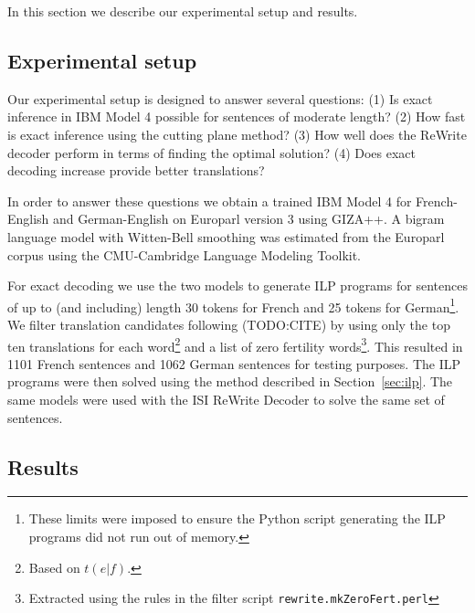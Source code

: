 In this section we describe our experimental setup and results.

\subsection{Experimental setup}
\label{sec:experimental-setup}

Our experimental setup is designed to answer several questions: (1) Is
exact inference in IBM Model 4 possible for sentences of moderate
length? (2) How fast is exact inference using the cutting plane
method? (3) How well does the ReWrite decoder perform in terms of
finding the optimal solution? (4) Does exact decoding increase provide
better translations?

In order to answer these questions we obtain a trained IBM Model 4 for
French-English and German-English on Europarl version 3 using GIZA++.
A bigram language model with Witten-Bell smoothing was estimated from
the Europarl corpus using the CMU-Cambridge Language Modeling Toolkit.

For exact decoding we use the two models to generate ILP programs for
sentences of up to (and including) length 30 tokens for French and 25
tokens for German\footnote{These limits were imposed to ensure the
  Python script generating the ILP programs did not run out of
  memory.}.  We filter translation candidates following (TODO:CITE) by
using only the top ten translations for each word\footnote{Based on
  $t(e|f)$.} and a list of zero fertility words\footnote{Extracted
  using the rules in the filter script
  \texttt{rewrite.mkZeroFert.perl}}.  This resulted in 1101 French
sentences and 1062 German sentences for testing purposes.  The ILP
programs were then solved using the method described in
Section~\ref{sec:ilp}.  The same models were used with the ISI ReWrite
Decoder to solve the same set of sentences.


\subsection{Results}
\label{sec:results-results}

